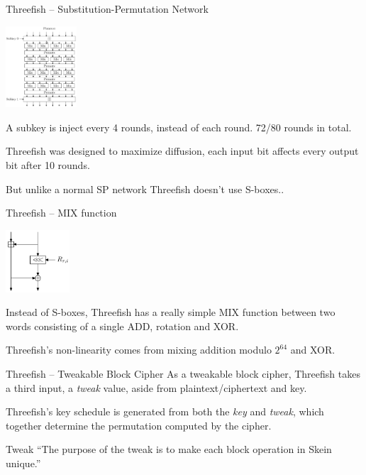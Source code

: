\documentclass{beamer}
\begin{document}
\begin{frame}{Threefish -- Substitution-Permutation Network}

	\begin{center}\includegraphics[width=100px]{skein-512}\end{center}

	A subkey is inject every 4 rounds, instead of each round. 72/80 rounds in total.

	\vspace{2mm}
	Threefish was designed to maximize diffusion, each input bit affects every output bit after 10 rounds.

	\vspace{2mm}
	But unlike a normal SP network Threefish doesn't use S-boxes..

\end{frame}

\begin{frame}{Threefish -- MIX function}

	\begin{center}\includegraphics[width=90px]{mix}\end{center}

	Instead of S-boxes, Threefish has a really simple MIX function between two words consisting of a single ADD, rotation and XOR.

	\vspace{2mm}
	Threefish's non-linearity comes from mixing addition modulo $2^{64}$ and XOR.

\end{frame}

\begin{frame}{Threefish -- Tweakable Block Cipher}
	As a tweakable block cipher, Threefish takes a third input, a \emph{tweak} value, aside from plaintext/ciphertext and key.

	\vspace{2mm}
	Threefish's key schedule is generated from both the \emph{key} and \emph{tweak}, which together determine the permutation computed by the cipher.

	\vspace{2mm}
	\begin{block}{Tweak}
		``The purpose of the tweak is to make each block operation in Skein unique.''
	\end{block}
\end{frame}
\end{document}

